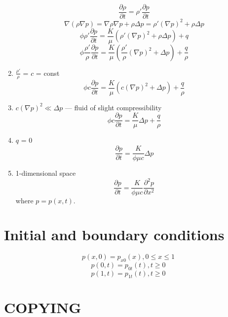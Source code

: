 \documentclass{article}
\begin{document}
\begin{enumerate}
\begin{equation}
\frac{\partial \rho}{\partial t} = \rho' \frac{\partial p}{\partial t}
\end{equation}
\begin{equation}
\nabla (\rho \nabla p) = \nabla \rho \nabla p + \rho \Delta p = \rho' (\nabla
p)^2 + \rho \Delta p
\end{equation}
\begin{equation}
\phi \rho' \frac{\partial p}{\partial t} = \frac{K}{\mu} \left(\rho' (\nabla
p)^2 + \rho \Delta p \right) + q
\end{equation}
\begin{equation}
\phi \frac{\rho'}{\rho} \frac{\partial p}{\partial t} = \frac{K}{\mu}
\left(\frac{\rho'}{\rho} (\nabla p)^2 + \Delta p \right) + \frac{q}{\rho}
\end{equation}
\item $\frac{\rho'}{\rho}$ = $c$ = const
\begin{equation}
\phi c \frac{\partial p}{\partial t} = \frac{K}{\mu} \left(c (\nabla p)^2 +
\Delta p \right) + \frac{q}{\rho}
\end{equation}
\item $c (\nabla p)^2 \ll \Delta p$ --- fluid of slight compressibility
\begin{equation}
\phi c \frac{\partial p}{\partial t} = \frac{K}{\mu} \Delta p + \frac{q}{\rho}
\end{equation}
\item $q$ = 0
\begin{equation}
\frac{\partial p}{\partial t} = \frac{K}{\phi \mu c} \Delta p
\end{equation}
\item 1-dimensional space
\begin{equation}
\frac{\partial p}{\partial t} = \frac{K}{\phi \mu c} \frac{\partial^2
p}{\partial x^2}
\end{equation}
where $p = p(x, t)$.
\end{enumerate}

\section{Initial and boundary conditions}
\begin{equation}
p(x, 0) = p_{x 0}(x), 0 \leq x \leq 1
\end{equation}
\begin{equation}
p(0, t) = p_{0 t}(t), t \geq 0
\end{equation}
\begin{equation}
p(1, t) = p_{1 t}(t), t \geq 0
\end{equation}
\section{COPYING}

\end{document}
